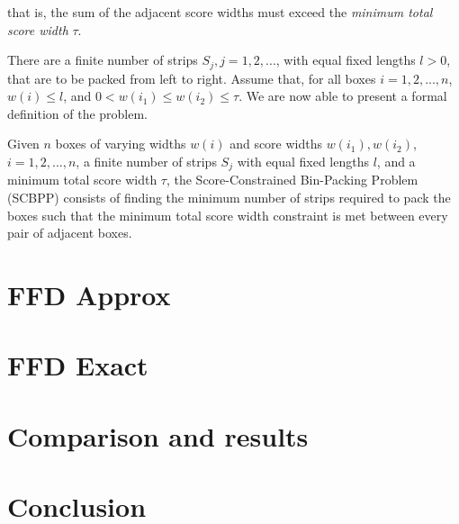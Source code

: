 \documentclass[oribibl]{llncs}
\begin{document}
that is, the sum of the adjacent score widths must exceed the \textit{minimum total score width} $\tau$.

There are a finite number of strips $S_j, j = 1, 2, ...$, with equal fixed lengths $l > 0$, that are to be packed from left to right. Assume that, for all boxes $i = 1, 2, ..., n$, $w(i) \leq l$, and $0 < w(i_1) \leq w(i_2) \leq \tau$. We are now able to present a formal definition of the problem.

\begin{definition}
	Given $n$ boxes of varying widths $w(i)$ and score widths $w(i_1), w(i_2)$, $i = 1, 2, ..., n$, a finite number of strips $S_j$ with equal fixed lengths $l$, and a minimum total score width $\tau$, the Score-Constrained Bin-Packing Problem (SCBPP) consists of finding the minimum number of strips required to pack the boxes such that the minimum total score width constraint is met between every pair of adjacent boxes. 
\end{definition}
































\section{FFD Approx}
\label{sec:ffdapprox}

\section{FFD Exact}
\label{sec:ffdexact}

\section{Comparison and results}
\label{sec:comparison}

\section{Conclusion}
\label{sec:conclusion}















\end{document}
